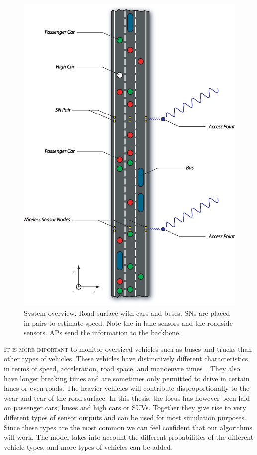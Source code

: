 \begin{figure}
\centering
  \begin{minipage}{1\linewidth}
  \centering
   \includegraphics[width=1\linewidth]{images/roadwTraffic}
  \caption[System overview]{System overview. Road surface with cars and buses. SNs are placed in pairs to estimate speed. Note the in-lane sensors and the roadside sensors. APs send the information to the backbone.}
  \label{fig-road}
  \end{minipage}
\end{figure}

\textsc{It is more important} to monitor oversized vehicles such as buses and trucks than other types of vehicles. These vehicles have distinctively different characteristics in terms of speed, acceleration, road space, and manoeuvre times~\cite{sun2000}. They also have longer breaking times and are sometimes only permitted to drive in certain lanes or even roads. The heavier vehicles will contribute disproportionally to the wear and tear of the road surface. In this thesis, the focus has however been laid on passenger cars, buses and high cars or SUVs. Together they give rise to very different types of sensor outputs and can be used for most simulation purposes. Since these types are the most common we can feel confident that our algorithms will work. The model takes into account the different probabilities of the different vehicle types, and more types of vehicles can be added.

